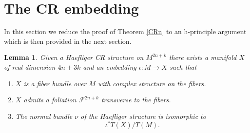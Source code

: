 \documentclass{amsart}
\newtheorem{lemma}{Lemma}[section]
\begin{document}
\section{The CR embedding}
In this section we reduce the proof of Theorem  \ref{CRn} to an
h-principle argument which is then provided in the next section.

\begin{lemma} Given a Haefliger CR structure on $M^{2n+k}$ there
exists a manifold $X$ of real dimension $4n+3k$ and an embedding $\iota
:M\to X$ such that
\begin{enumerate}
\item 
$X$ is a fiber bundle over $M$ with complex structure on the
fibers.\label{X1}
\item 
$X$ admits a foliation ${{\mathcal{F}}} ^{2n+k}$ transverse to the fibers.\label{X2}
\item 
The normal bundle $\nu$ of the Haefliger structure is isomorphic to\label{X3}
\[
\iota^*T(X)/T(M).
\]
\end{enumerate}

\end{lemma}
\end{document}
